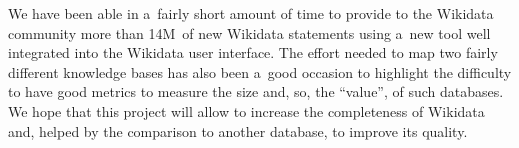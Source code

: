\documentclass{sig-alternate}
\begin{document}
We have been able in a~fairly short amount of time to provide to the Wikidata community
more than 14M~of new Wikidata statements using a~new tool
well integrated into the Wikidata user interface.
The effort needed to map two fairly different knowledge bases has also been a~good occasion
to highlight the difficulty to have good metrics to measure the size
and, so, the ``value'', of such databases.
We hope that this project will allow to increase the completeness of Wikidata and,
helped by the comparison to another database, to improve its quality.




\balancecolumns
\end{document}
